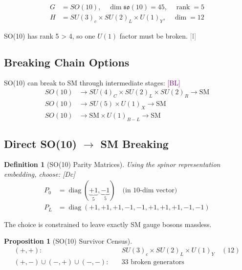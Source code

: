 \documentclass[11pt,a4paper]{article}
\newtheorem{proposition}[theorem]{Proposition}
\newtheorem{definition}[theorem]{Definition}
\newcommand{\tagDc}{\textcolor{blue!50!black}{[Dc]}}
\newcommand{\tagI}{\textcolor{gray}{[I]}}
\newcommand{\tagBL}{\textcolor{purple}{[BL]}}
\DeclareMathOperator{\diag}{diag}
\DeclareMathOperator{\rank}{rank}
\begin{document}
\begin{align}
\label{eq:so10-dim}
G &= SO(10), \quad \dim \mathfrak{so}(10) = 45, \quad \rank = 5 \\
\label{eq:so10-target}
H &= SU(3)_c \times SU(2)_L \times U(1)_Y, \quad \dim = 12
\end{align}

SO(10) has rank 5 > 4, so one $U(1)$ factor must be broken. \tagI

\subsection{Breaking Chain Options}

SO(10) can break to SM through intermediate stages: \tagBL
\begin{align}
\label{eq:so10-ps}
SO(10) &\to SU(4)_C \times SU(2)_L \times SU(2)_R \to \text{SM} \\
\label{eq:so10-su5}
SO(10) &\to SU(5) \times U(1)_X \to \text{SM} \\
\label{eq:so10-direct}
SO(10) &\to \text{SM} \times U(1)_{B-L} \to \text{SM}
\end{align}

\subsection{Direct SO(10) $\to$ SM Breaking}

\begin{definition}[SO(10) Parity Matrices]
\label{def:so10-parity}
Using the spinor representation embedding, choose: \tagDc
\begin{align}
\label{eq:so10-P0}
P_0 &= \diag(\underbrace{+1}_{5}, \underbrace{-1}_{5}) \quad \text{(in 10-dim vector)} \\
\label{eq:so10-PL}
P_L &= \diag(+1,+1,+1,-1,-1,+1,+1,+1,-1,-1)
\end{align}
\end{definition}

The choice is constrained to leave exactly SM gauge bosons massless.

\begin{proposition}[SO(10) Survivor Census]
\label{prop:so10-census}
\begin{align}
\label{eq:so10-survivors}
(+,+): \quad & SU(3)_c \times SU(2)_L \times U(1)_Y \quad (12) \\
\label{eq:so10-broken-pp}
(+,-) \cup (-,+) \cup (-,-): \quad & 33 \text{ broken generators}
\end{align}
\end{proposition}
\end{document}
